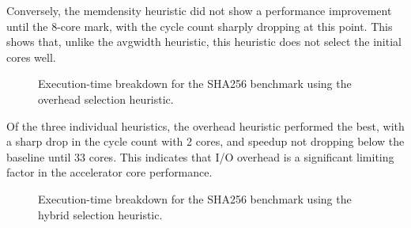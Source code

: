 \documentclass{UoYCSproject}
\begin{document}
Conversely, the memdensity heuristic did not show a performance improvement until the 8-core mark, with
the cycle count sharply dropping at this point. This shows that, unlike the avgwidth heuristic, this heuristic
does not select the initial cores well.

\begin{figure}[H]
\caption{Execution-time breakdown for the SHA256 benchmark using the overhead selection heuristic.}
\label{fig:breakdownOverheadSHA256}
\end{figure}

Of the three individual heuristics, the overhead heuristic performed the best, with a sharp drop in the cycle count
with 2 cores, and speedup not dropping below the baseline until 33 cores. This indicates that I/O overhead is a significant
limiting factor in the accelerator core performance.

\begin{figure}[H]
\caption{Execution-time breakdown for the SHA256 benchmark using the hybrid selection heuristic.}
\label{fig:breakdownHybridSHA256}
\end{figure}
\end{document}
